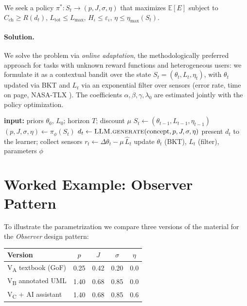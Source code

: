 \documentclass[10pt,a4paper]{article}
\begin{document}
We seek a policy $\pi^{*}: S_t \to (p, J, \sigma, \eta)$ that
maximizes $\mathbb{E}[E]$ subject to $C_{\text{ch}} \geq R(d_t)$,
$L_{\text{tot}} \leq L_{\max}$, $H_{\iota} \leq \varepsilon_{\iota}$,
$\eta \leq \eta_{\max}(S_t)$.

\paragraph{Solution.} We solve the problem via \emph{online adaptation},
the methodologically preferred approach for tasks with unknown reward
functions and heterogeneous users: we formulate it as a contextual
bandit \cite{li2010} over the state $S_t = (\theta_t, L_t, \eta_t)$,
with $\theta_t$ updated via BKT \cite{corbett1995} and $L_t$ via an
exponential filter over sensors (error rate, time on page, NASA-TLX
\cite{hart1988}). The coefficients $\alpha, \beta, \gamma, \lambda_0$
are estimated jointly with the policy optimization.

\begin{algorithm}[h]
\small
\caption{Adaptive policy $\pi$ (contextual bandit)}
\label{alg:policy}
\begin{algorithmic}[1]
  \State \textbf{input:} priors $\theta_0$, $L_0$; horizon $T$; discount $\mu$
    \State $S_t \gets (\theta_{t-1}, L_{t-1}, \eta_{t-1})$
    \State $(p, J, \sigma, \eta) \gets \pi_\phi(S_t)$ 
    \State $d_t \gets \textsc{LLM.generate}(\text{concept}, p, J, \sigma, \eta)$
    \State present $d_t$ to the learner; collect sensors
    \State $r_t \gets \Delta \theta_t - \mu\, \hat L_t$
    \State update $\theta_t$ (BKT), $L_t$ (filter), parameters $\phi$
  \EndFor
\end{algorithmic}
\end{algorithm}

\section{Worked Example: Observer Pattern}

To illustrate the parametrization we compare three versions of the
material for the \emph{Observer} design pattern:

\begin{center}
\small
\begin{tabular}{lcccc}
\hline
Version & $p$ & $J$ & $\sigma$ & $\eta$ \\
\hline
V\textsubscript{A} textbook (GoF) & 0.25 & 0.42 & 0.20 & 0.0 \\
V\textsubscript{B} annotated UML  & 1.40 & 0.68 & 0.85 & 0.0 \\
V\textsubscript{C} + AI assistant & 1.40 & 0.68 & 0.85 & 0.6 \\
\hline
\end{tabular}
\end{center}
\end{document}
